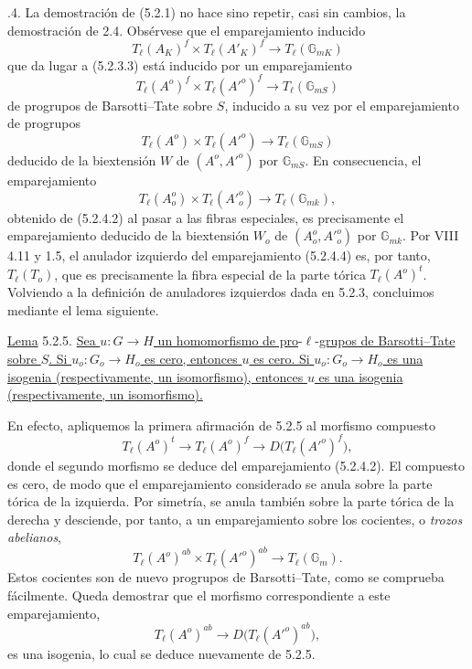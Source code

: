 \smallskip
{}.4. La demostración de (5.2.1) no hace sino repetir, casi sin cambios,
la demostración de 2.4. Obsérvese que el emparejamiento inducido
\begin{equation}\tag{5.2.4.1}
 T_\ell(A_K)^f\times T_\ell(A'_K)^f
 \longrightarrow T_\ell(\mathbb G_{mK})
\end{equation}
que da lugar a (5.2.3.3) está inducido por un emparejamiento
\begin{equation}\tag{5.2.4.2}
 T_\ell(A^o)^f\times T_\ell({A'}^o)^f
 \longrightarrow T_\ell(\mathbb G_{mS})
\end{equation}
de progrupos de Barsotti--Tate sobre $S$, inducido a su vez por
el emparejamiento de progrupos
\begin{equation}\tag{5.2.4.3}
 T_\ell(A^o)\times T_\ell({A'}^o)
 \longrightarrow T_\ell(\mathbb G_{mS})
\end{equation}
deducido de la biextensión $W$ de $(A^o,{A'}^o)$ por
$\mathbb G_{mS}$. En consecuencia, el emparejamiento
\begin{equation}\tag{5.2.4.4}
 T_\ell(A_o^o)\times T_\ell({A'}_o^o)
 \longrightarrow T_\ell(\mathbb G_{mk}),
\end{equation}
obtenido de (5.2.4.2) al pasar a las fibras especiales, es precisamente
el emparejamiento deducido de la biextensión $W_o$ de
$(A_o^o,{A'}_o^o)$ por $\mathbb G_{mk}$. Por VIII 4.11 y 1.5, el
anulador izquierdo del emparejamiento (5.2.4.4) es, por tanto,
$T_\ell(T_o)$, que es precisamente la fibra especial de la parte tórica
$T_\ell(A^o)^t$. Volviendo a la definición de anuladores izquierdos
dada en 5.2.3, concluimos mediante el lema siguiente.

\medskip
\noindent
\underline{Lema} 5.2.5. \underline{Sea $u:G\longrightarrow H$ un
homomorfismo de pro}-$\ell$-\underline{grupos de Barsotti--Tate sobre $S$. Si
$u_o:G_o\longrightarrow H_o$ es cero, entonces $u$ es cero. Si
$u_o:G_o\longrightarrow H_o$ es una isogenia (respectivamente, un
isomorfismo), entonces $u$ es una isogenia (respectivamente, un
isomorfismo).}

En efecto, apliquemos la primera afirmación de 5.2.5 al morfismo
compuesto
\[
 T_\ell(A^o)^t
 \longrightarrow T_\ell(A^o)^f
 \longrightarrow D\bigl(T_\ell({A'}^o)^f\bigr),
\]
donde el segundo morfismo se deduce del emparejamiento (5.2.4.2). El
compuesto es cero, de modo que el emparejamiento considerado se anula
sobre la parte tórica de la izquierda. Por simetría, se anula también
sobre la parte tórica de la derecha y desciende, por tanto, a un
emparejamiento sobre los cocientes, o \emph{trozos abelianos},
\[
 T_\ell(A^o)^{ab}\times T_\ell({A'}^o)^{ab}
 \longrightarrow T_\ell(\mathbb G_m).
\]
Estos cocientes son de nuevo progrupos de Barsotti--Tate, como
se comprueba fácilmente. Queda demostrar que el morfismo correspondiente
a este emparejamiento,
\[
 T_\ell(A^o)^{ab}
 \longrightarrow D\bigl(T_\ell({A'}^o)^{ab}\bigr),
\]
es una isogenia, lo cual se deduce nuevamente de 5.2.5.


